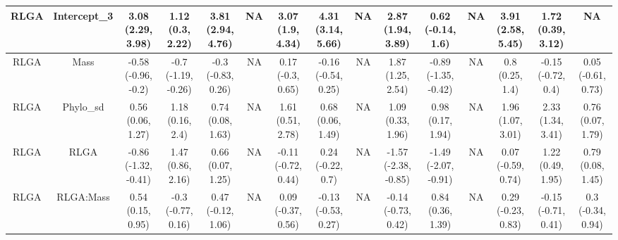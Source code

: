 \begin{longtable}[t]{c|c|c|c|c|c|c|c|c|c|c|c|c|c|c}
\hline
RLGA & Intercept_3 & 3.08 (2.29, 3.98) & 1.12 (0.3, 2.22) & 3.81 (2.94, 4.76) & NA & 3.07 (1.9, 4.34) & 4.31 (3.14, 5.66) & NA & 2.87 (1.94, 3.89) & 0.62 (-0.14, 1.6) & NA & 3.91 (2.58, 5.45) & 1.72 (0.39, 3.12) & NA\\
\hline
RLGA & Mass & -0.58 (-0.96, -0.2) & -0.7 (-1.19, -0.26) & -0.3 (-0.83, 0.26) & NA & 0.17 (-0.3, 0.65) & -0.16 (-0.54, 0.25) & NA & 1.87 (1.25, 2.54) & -0.89 (-1.35, -0.42) & NA & 0.8 (0.25, 1.4) & -0.15 (-0.72, 0.4) & 0.05 (-0.61, 0.73)\\
\hline
RLGA & Phylo_sd & 0.56 (0.06, 1.27) & 1.18 (0.16, 2.4) & 0.74 (0.08, 1.63) & NA & 1.61 (0.51, 2.78) & 0.68 (0.06, 1.49) & NA & 1.09 (0.33, 1.96) & 0.98 (0.17, 1.94) & NA & 1.96 (1.07, 3.01) & 2.33 (1.34, 3.41) & 0.76 (0.07, 1.79)\\
\hline
RLGA & RLGA & -0.86 (-1.32, -0.41) & 1.47 (0.86, 2.16) & 0.66 (0.07, 1.25) & NA & -0.11 (-0.72, 0.44) & 0.24 (-0.22, 0.7) & NA & -1.57 (-2.38, -0.85) & -1.49 (-2.07, -0.91) & NA & 0.07 (-0.59, 0.74) & 1.22 (0.49, 1.95) & 0.79 (0.08, 1.45)\\
\hline
RLGA & RLGA:Mass & 0.54 (0.15, 0.95) & -0.3 (-0.77, 0.16) & 0.47 (-0.12, 1.06) & NA & 0.09 (-0.37, 0.56) & -0.13 (-0.53, 0.27) & NA & -0.14 (-0.73, 0.42) & 0.84 (0.36, 1.39) & NA & 0.29 (-0.23, 0.83) & -0.15 (-0.71, 0.41) & 0.3 (-0.34, 0.94)\\
\hline
\end{longtable}
\endgroup{}
